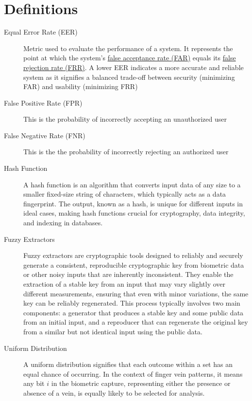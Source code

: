 \newpage
\section{Definitions}
\begin{description}
    \item[Equal Error Rate (EER)] \label{def:EER} Metric used to evaluate the performance of a system. It represents the point at which the system's \hyperref[def:FAR]{false acceptance rate (FAR)} equals its \hyperref[def:FRR]{false rejection rate (FRR)}. A lower EER indicates a more accurate and reliable system as it signifies a balanced trade-off between security (minimizing FAR) and usability (minimizing FRR)

    \item[False Positive Rate (FPR)] \label{def:FPR} This is the probability of incorrectly accepting an unauthorized user

    \item[False Negative Rate (FNR)] \label{def:FNR} This is the the probability of incorrectly rejecting an authorized user

    \item[Hash Function] \label{def:Hash_Function} A hash function is an algorithm that converts input data of any size to a smaller fixed-size string of characters, which typically acts as a data fingerprint. The output, known as a hash, is unique for different inputs in ideal cases, making hash functions crucial for cryptography, data integrity, and indexing in databases.

    \item[Fuzzy Extractors] \label{def:Fuzzy_Extractors} Fuzzy extractors are cryptographic tools designed to reliably and securely generate a consistent, reproducible cryptographic key from biometric data or other noisy inputs that are inherently inconsistent. They enable the extraction of a stable key from an input that may vary slightly over different measurements, ensuring that even with minor variations, the same key can be reliably regenerated. This process typically involves two main components: a generator that produces a stable key and some public data from an initial input, and a reproducer that can regenerate the original key from a similar but not identical input using the public data.

    \item[Uniform Distribution] \label{def:Uniform Distribution} A uniform distribution signifies that each outcome within a set has an equal chance of occurring. In the context of finger vein patterns, it means any bit \(i\) in the biometric capture, representing either the presence or absence of a vein, is equally likely to be selected for analysis.


\end{description}
